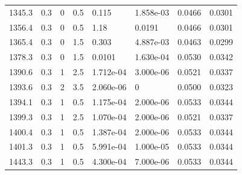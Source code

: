 \documentclass[preview]{standalone}
\begin{document}
{{{\begin{tabular}{L{1.2cm}C{1.2cm} C{0.3cm}C{0.5cm} C{1.4cm}C{1.4cm} C{1.4cm}C{1.4cm}}
  1345.3  &   0.3  & 0     & 0.5 &  0.115  & 1.858e-03  & 0.0466 &  0.0301   \\ 
  1356.4  &   0.3  & 0     & 0.5 &  1.18  & 0.0191  & 0.0466 &  0.0301   \\ 
  1365.4  &   0.3  & 0     & 1.5 &  0.303  & 4.887e-03  & 0.0463 &  0.0299   \\ 
  1378.3  &   0.3  & 0     & 1.5 &  0.0101  & 1.630e-04  & 0.0530 &  0.0342   \\ 
  1390.6  &   0.3  & 1     & 2.5 &  1.712e-04  & 3.000e-06  & 0.0521 &  0.0337   \\ 
  1393.6  &   0.3  & 2     & 3.5 &  2.060e-06  & 0  & 0.0500 &  0.0323   \\ 
  1394.1  &   0.3  & 1     & 0.5 &  1.175e-04  & 2.000e-06  & 0.0533 &  0.0344   \\ 
  1399.3  &   0.3  & 1     & 2.5 &  1.070e-04  & 2.000e-06  & 0.0521 &  0.0337   \\ 
  1400.4  &   0.3  & 1     & 0.5 &  1.387e-04  & 2.000e-06  & 0.0533 &  0.0344   \\ 
  1401.3  &   0.3  & 1     & 0.5 &  5.991e-04  & 1.000e-05  & 0.0533 &  0.0344   \\ 
  1443.3  &   0.3  & 1     & 0.5 &  4.300e-04  & 7.000e-06  & 0.0533 &  0.0344   \\ 
\hline 
\end{tabular} 

}}}
\end{document}
